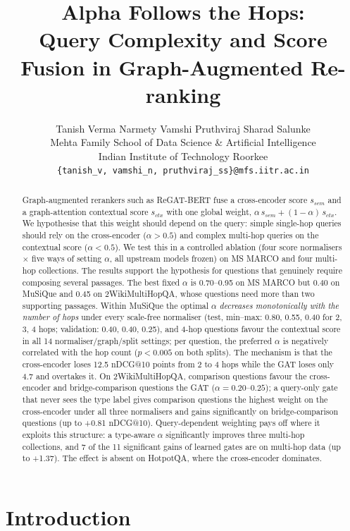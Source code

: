 \documentclass[11pt]{article}
\title{Alpha Follows the Hops:\\
Query Complexity and Score Fusion in Graph-Augmented Re-ranking}
\author{Tanish Verma \quad Narmety Vamshi \quad Pruthviraj Sharad Salunke \\
  Mehta Family School of Data Science \& Artificial Intelligence \\
  Indian Institute of Technology Roorkee \\
  \texttt{\{tanish\_v, vamshi\_n, pruthviraj\_ss\}@mfs.iitr.ac.in}}
\newcommand{\sem}{s_{\mathit{sem}}}
\newcommand{\ctx}{s_{\mathit{ctx}}}
\begin{document}
\maketitle

\begin{abstract}
Graph-augmented rerankers such as ReGAT-BERT fuse a cross-encoder score $\sem$ and a
graph-attention contextual score $\ctx$ with one global weight,
$\alpha\,\sem + (1-\alpha)\,\ctx$. We hypothesise that this weight should depend on the query:
simple single-hop queries should rely on the cross-encoder ($\alpha>0.5$) and complex multi-hop
queries on the contextual score ($\alpha<0.5$). We test this in a controlled ablation (four score
normalisers $\times$ five ways of setting $\alpha$, all upstream models frozen) on MS MARCO and four
multi-hop collections. The results support the hypothesis for questions that genuinely require
composing several passages. The best fixed $\alpha$ is 0.70--0.95 on MS MARCO but 0.40 on MuSiQue
and 0.45 on 2WikiMultiHopQA, whose questions need more than two supporting passages. Within MuSiQue
the optimal $\alpha$ \emph{decreases monotonically with the number of hops} under every scale-free
normaliser (test, min--max: 0.80, 0.55, 0.40 for 2, 3, 4 hops; validation: 0.40, 0.40, 0.25), and
4-hop questions favour the contextual score in all 14 normaliser/graph/split settings; per question,
the preferred $\alpha$ is negatively correlated with the hop count ($p<0.005$ on both splits). The
mechanism is that the cross-encoder loses 12.5 nDCG@10 points from 2 to 4 hops while the GAT loses
only 4.7 and overtakes it. On 2WikiMultiHopQA, comparison questions favour the cross-encoder and
bridge-comparison questions the GAT ($\alpha=0.20$--$0.25$); a query-only gate that never sees the
type label gives comparison questions the highest weight on the cross-encoder under all three normalisers and gains significantly on
bridge-comparison questions (up to +0.81 nDCG@10). Query-dependent weighting pays off where it
exploits this structure: a type-aware $\alpha$ significantly improves three multi-hop collections,
and 7 of the 11 significant gains of learned gates are on multi-hop data (up to +1.37). The effect is
absent on HotpotQA, where the cross-encoder dominates.
\end{abstract}

\section{Introduction}
\label{sec:intro}
\end{document}
